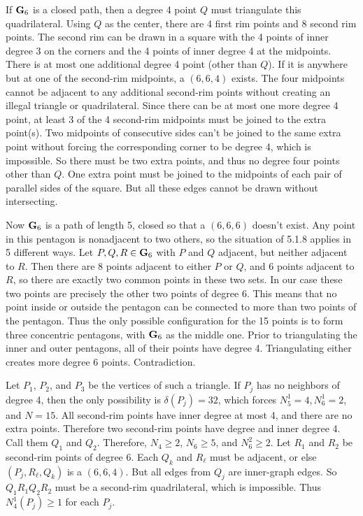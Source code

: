 If $\bold G_6$ is a closed path, then a degree 4
point $Q$ must triangulate this quadrilateral. Using $Q$
as the center, there are 4 first rim points and 8 second
rim points. The second rim can be drawn in a square with the
4 points of inner degree 3 on the corners and the 4 points of
inner degree 4 at the midpoints. There is at most one
additional degree 4 point (other than $Q$). If it is
anywhere but at one of the second-rim midpoints, a
$(6,6,4)$ exists. The four midpoints cannot be adjacent to
any additional second-rim points without creating an
illegal triangle or quadrilateral. Since there can be at most
one more degree 4 point, at least 3 of the 4 second-rim
midpoints must be joined
to the extra point(s). Two midpoints of consecutive sides
can't be joined to the same extra point without forcing the
corresponding corner to be degree 4, which is impossible.
So there must be two extra points, and thus no degree four
points other than $Q$. One extra point must be joined to
the midpoints of each pair of parallel sides of the square.
But all these edges cannot be drawn without intersecting.
 
 Now $\bold G_6$ is a path of
length 5, closed so that a $(6,6,6)$ doesn't exist. Any
point in this pentagon is nonadjacent to two others, so the
situation of 5.1.8 applies in 5 different ways. Let $P, Q, R\in
\bold G_6$ with $P$ and $Q$ adjacent, but neither adjacent
to $R$. Then there are 8 points adjacent to either $P$ or $Q$,
and 6 points adjacent to $R$, so there are exactly two
common points in these two sets. In our case these two
points are precisely the other two points of degree 6. This
means that no point inside or outside the pentagon can be
connected to more than two points of the pentagon. Thus
the only possible configuration for the 15 points is to form
three concentric pentagons, with $\bold G_6$ as the
middle one. Prior to triangulating the inner and outer
pentagons, all of their points have degree 4. Triangulating
either creates more degree 6 points. Contradiction.
 
 Let $P_1$, $P_2$, and
$P_3$ be the vertices of such a triangle. If $P_j$ has no
neighbors of degree 4, then the only possibility is
$\delta(P_j)=32$, which forces $N^1_5=4, N^1_6=2$, and
$N=15$. All second-rim points have inner degree at most 4,
and there are no extra points. Therefore two second-rim
points have degree and inner degree 4. Call them $Q_1$ and
$Q_2$. Therefore, $N_4\geq 2$, $N_6\geq 5$, and
$N_6^2\geq 2$. Let $R_1$ and $R_2$ be second-rim points
of degree 6. Each $Q_k$ and $R_{\ell}$ must be adjacent, or
else $(P_j, R_{\ell}, Q_k)$ is a $(6,6,4)$. But all edges from
$Q_j$ are inner-graph edges. So $Q_1R_1Q_2R_2$ must be
a second-rim quadrilateral, which is impossible. Thus
$N_4^1(P_j)\geq 1$ for each $P_j$.
 
